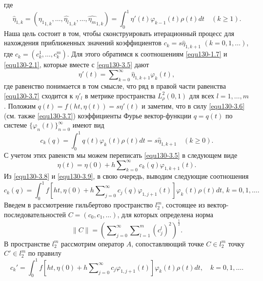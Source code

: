 где
  \begin{equation}\label{equ130-3.6}
\hat \eta_{1,k}=(\widehat{\eta_1}_{1,k},\ldots,\widehat {\eta_l}_{1,k},\ldots,\widehat{\eta_m}_{1,k})=\int_{0}^1 \eta'(t)\varphi_{k-1}(t)\rho(t)dt\quad(k\ge1).
\end{equation}
Наша цель состоит в том, чтобы сконструировать итерационный процесс для нахождения приближенных значений коэффициентов $c_k=s\hat \eta_{1,k+1}$ $(k=0,1,\ldots)$, где $c_k=(c_k^1,\ldots,c_k^m)$. Для этого обратимся к соотношениям \eqref{equ130-1.7} и \eqref{equ130-2.1}, которые вместе с \eqref{equ130-3.5} дают
\begin{equation}\label{equ130-3.7}
\eta'(t)=  \sum\nolimits_{k=0}^\infty \hat \eta_{1,k+1}\varphi_k(t),
\end{equation}
где равенство понимается в том смысле, что ряд в правой части равенства \eqref{equ130-3.7} сходится к $\eta'_l$ в метрике пространства $L^2_{\rho}(0,1)$ для всех $l=1,\ldots,m$. Положим $q(t)=f(ht,\eta(t))=s\eta'(t)$ и заметим, что в силу  \eqref{equ130-3.6} (см. также \eqref{equ130-3.7}) коэффициенты Фурье вектор-функции $q=q(t)$ по системе  $\{\varphi_{n}(t)\}_{n=0}^\infty$ имеют вид
\begin{equation}\label{equ130-3.8}
 c_k(q)=\int_{0}^1 q(t)\varphi_{k}(t)\rho(t)dt=s\hat \eta_{1,k+1} \quad (k\ge0).
\end{equation}
С учетом этих равенств мы можем переписать \eqref{equ130-3.5} в следующем виде
\begin{equation}\label{equ130-3.9}
\eta(t)= \eta(0)+ h\sum\nolimits_{k=0}^\infty c_k(q){\varphi}_{1,k+1}(t).
\end{equation}
Из  \eqref{equ130-3.8} и \eqref{equ130-3.9}, в свою очередь, выводим следующие соотношения
\begin{equation}\label{equ130-3.10}
c_k(q)=\int_{0}^1f\left[ht,\eta(0)+ h\sum\nolimits_{j=0}^\infty c_j(q)\varphi_{1,j+1}(t)\right]\varphi_k(t)\rho(t) dt,\, k=0,1,\ldots.
\end{equation}
Введем в рассмотрение гильбертово пространство $l_2^m$, состоящее из вектор-после\-дователь\-ностей $C=(c_0,c_1,\ldots)$, для которых определена норма
$$\|C\|=\left(\sum\nolimits_{j=0}^\infty \sum\nolimits_{l=1}^{m}(c_j^l)^2\right)^\frac12.$$  В пространстве $l_2^m$ рассмотрим оператор $A$, сопоставляющий точке $C\in l_2^m$ точку $C'\in l_2^m$ по правилу
\begin{equation}\label{equ130-3.11}
c_k'=\int_{0}^1f\left[ht,\eta(0)+ h\sum\nolimits_{j=0}^\infty c_j
\varphi_{1,j+1}(t)\right]\varphi_k(t)\rho(t) dt,\quad k=0,1,\ldots.
\end{equation}
